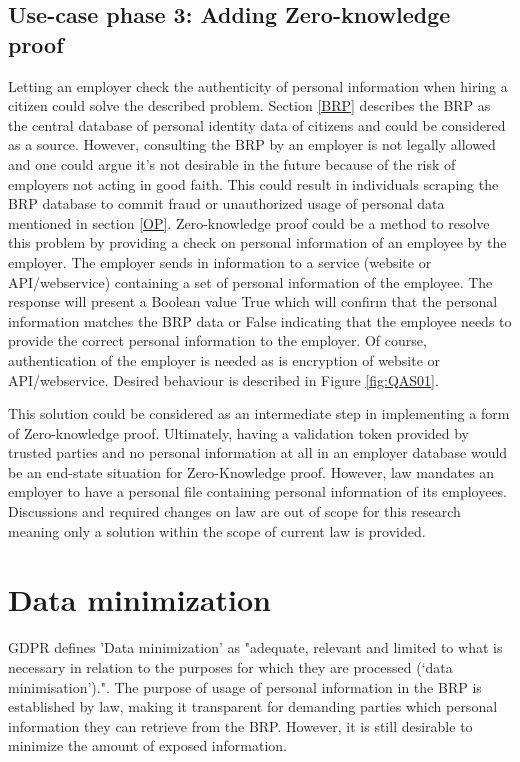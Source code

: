 \subsection{Use-case phase 3: Adding Zero-knowledge proof}
Letting an employer check the authenticity of personal information when hiring a citizen could solve the described problem. Section \ref{BRP} describes the BRP as the central database of personal identity data of citizens and could be considered as a source. However, consulting the BRP by an employer is not legally allowed and one could argue it's not desirable in the future because of the risk of employers not acting in good faith. This could result in individuals scraping the BRP database to commit fraud or unauthorized usage of personal data mentioned in section \ref{OP}. Zero-knowledge proof could be a method to resolve this problem by providing a check on personal information of an employee by the employer. The employer sends in information to a service (website or API/webservice) containing a set of personal information of the employee. The response will present a Boolean value True which will confirm that the personal information matches the BRP data or False indicating that the employee needs to provide the correct personal information to the employer. Of course, authentication of the employer is needed as is encryption of website or API/webservice. Desired behaviour is described in Figure \ref{fig:QAS01}.

This solution could be considered as an intermediate step in implementing a form of Zero-knowledge proof. Ultimately, having a validation token provided by trusted parties and no personal information at all in an employer database would be an end-state situation for Zero-Knowledge proof. However, law mandates an employer to have a personal file containing personal information of its employees. Discussions and required changes on law are out of scope for this research meaning only a solution within the scope of current law is provided.
\clearpage

\section{Data minimization} \label{data-minimization}

GDPR \cite{GDPR} defines 'Data minimization' as "adequate, relevant and limited to what is necessary in relation to the purposes for which they are processed (‘data minimisation’).". The purpose of usage of personal information in the BRP is established by law, making it transparent for demanding parties which personal information they can retrieve from the BRP. However, it is still desirable to minimize the amount of exposed information.

